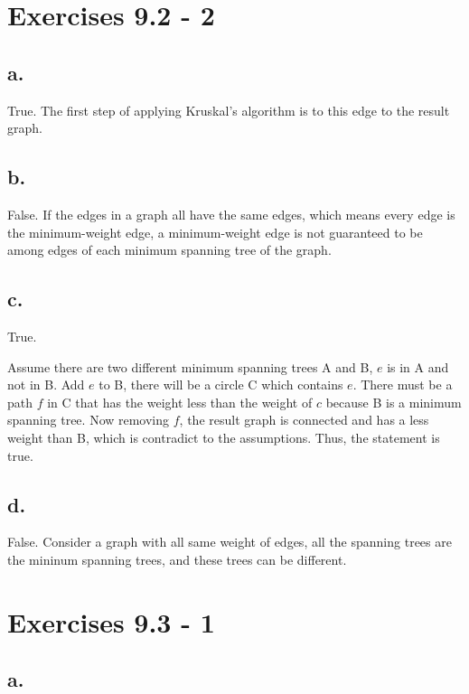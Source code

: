 \documentclass{article}
\begin{document}
\clearpage 

\section{Exercises 9.2 - 2}

\subsection*{a.}

True. The first step of applying Kruskal's algorithm is to this edge to the result graph.

\subsection*{b.}

False. If the edges in a graph all have the same edges, which means every edge is the minimum-weight edge, a minimum-weight edge is not guaranteed to be among edges of each minimum spanning tree of the graph.

\subsection*{c.}

True. 

Assume there are two different minimum spanning trees A and B, $e$ is in A and not in B. Add $e$ to B, there will be a circle C which contains $e$. There must be a path $f$ in C that has the weight less than the weight of $c$ because B is a minimum spanning tree. Now removing $f$, the result graph is connected and has a less weight than B, which is contradict to the assumptions. Thus, the statement is true.

\subsection*{d.}

False. Consider a graph with all same weight of edges, all the spanning trees are the mininum spanning trees, and these trees can be different. 

\section{Exercises 9.3 - 1}

\subsection*{a.}
\end{document}
